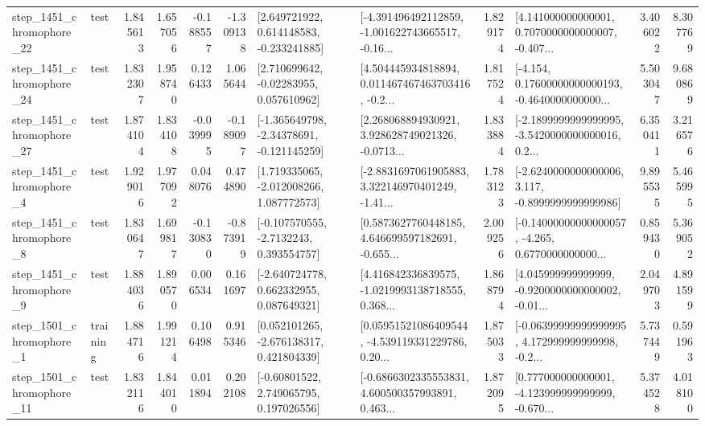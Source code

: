\begin{tabular}{llrrrrllrlrr}
 step\_1451\_chromophore\_22 &      test &      1.845613 &    1.657056 &     -0.188557 & -1.309138 &    [2.649721922, 0.614148583, -0.233241885] &  [-4.391496492112859, -1.001622743665517, -0.16... &       1.829174 &  [4.141000000000001, 0.7070000000000007, -0.407... &            3.406022 &          8.307769 \\
 step\_1451\_chromophore\_24 &      test &      1.832307 &    1.958740 &      0.126433 &  1.065644 &     [2.710699642, -0.02283955, 0.057610962] &  [4.504445934818894, 0.011467467463703416, -0.2... &       1.817524 &  [-4.154, 0.17600000000000193, -0.4640000000000... &            5.503047 &          9.680869 \\
 step\_1451\_chromophore\_27 &      test &      1.874104 &    1.834108 &     -0.039995 & -0.189097 &   [-1.365649798, -2.34378691, -0.121145259] &  [2.268068894930921, 3.928628749021326, -0.0713... &       1.833884 &  [-2.1899999999999995, -3.5420000000000016, 0.2... &            6.350411 &          3.216576 \\
  step\_1451\_chromophore\_4 &      test &      1.929016 &    1.977092 &      0.048076 &  0.474890 &    [1.719335065, -2.012008266, 1.087772573] &  [-2.8831697061905883, 3.322146970401249, -1.41... &       1.783123 &  [-2.6240000000000006, 3.117, -0.8999999999999986] &            9.895535 &          5.465995 \\
  step\_1451\_chromophore\_8 &      test &      1.830647 &    1.699817 &     -0.130830 & -0.873919 &     [-0.107570555, -2.7132243, 0.393554757] &  [0.5873627760448185, 4.646699597182691, -0.655... &       2.009256 &  [-0.14000000000000057, -4.265, 0.6770000000000... &            0.859430 &          5.369052 \\
  step\_1451\_chromophore\_9 &      test &      1.884036 &    1.890570 &      0.006534 &  0.161697 &    [-2.640724778, 0.662332955, 0.087649321] &  [4.416842336839575, -1.0219993138718555, 0.368... &       1.868794 &  [4.045999999999999, -0.9200000000000002, -0.01... &            2.049703 &          4.891599 \\
  step\_1501\_chromophore\_1 &  training &      1.884716 &    1.991214 &      0.106498 &  0.915346 &    [0.052101265, -2.676138317, 0.421804339] &  [0.05951521086409544, -4.539119331229786, 0.20... &       1.875033 &  [-0.06399999999999995, 4.172999999999998, -0.2... &            5.737449 &          0.591963 \\
 step\_1501\_chromophore\_11 &      test &      1.832116 &    1.844010 &      0.011894 &  0.202108 &     [-0.60801522, 2.749065795, 0.197026556] &  [-0.6866302335553831, 4.600500357993891, 0.463... &       1.872095 &  [0.777000000000001, -4.123999999999999, -0.670... &            5.374528 &          4.018100 \\

\end{tabular}
